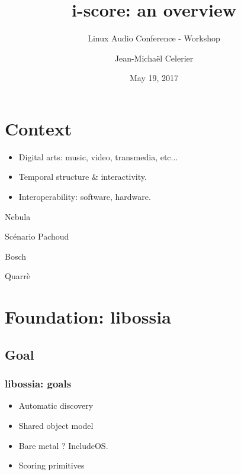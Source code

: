 \documentclass[handout]{beamer}
\author{Jean-Michaël Celerier}
\title{i-score: an overview}
\subtitle{Linux Audio Conference - Workshop}
\date{May 19, 2017}
\begin{document}
\begin{frame}
\maketitle
\end{frame}
\begin{frame}
\Large
\tableofcontents
\end{frame}

\section{Context}
\Large
\begin{frame}
\begin{itemize}
    \item Digital arts: music, video, transmedia, etc...
    \item Temporal structure \& interactivity.
    \item Interoperability: software, hardware.
\end{itemize}
\end{frame}

\begin{frame}
Nebula
\end{frame}

\begin{frame}
Scénario Pachoud
\end{frame}

\begin{frame}
Bosch
\end{frame}

\begin{frame}
Quarrè
\end{frame}


\section{Foundation: libossia}
\subsection{Goal}

\begin{frame}
\frametitle{libossia: goals}
\Large
\begin{itemize}
    \item Automatic discovery
    \item Shared object model
    \item Bare metal ? IncludeOS.
    \item Scoring primitives
\end{itemize}
\end{frame}
\end{document}
